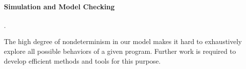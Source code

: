 \paragraph{Simulation and Model Checking}

\cite{promising-arm}.

The high degree of nondeterminism in our model makes it hard to exhaustively explore all possible
behaviors of a given program.  Further work is required to develop efficient methods and tools for
this purpose.











